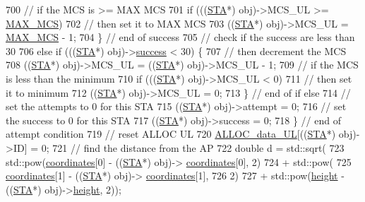 \begin{DoxyCode}
{{700                 \textcolor{comment}{// if the MCS is >= MAX MCS}
701                 \textcolor{keywordflow}{if} (((\hyperlink{classSTA}{STA}*) obj)->MCS\_UL >= \hyperlink{classAP_a1fe0d98f0db9557f18e560f8bc96c2fc}{MAX\_MCS})
702                     \textcolor{comment}{// then set it to MAX MCS}
703                     ((\hyperlink{classSTA}{STA}*) obj)->MCS\_UL = \hyperlink{classAP_a1fe0d98f0db9557f18e560f8bc96c2fc}{MAX\_MCS} - 1;
704             \} \textcolor{comment}{// end of success}
705               \textcolor{comment}{// check if the success are less than 30%
706             \textcolor{keywordflow}{else} \textcolor{keywordflow}{if} (((\hyperlink{classSTA}{STA}*) obj)->\hyperlink{classAP_aa9d8130f487d3ba13dc6b22fe5e3868d}{success} < 30) \{
707                 \textcolor{comment}{// then decrement the MCS}
708                 ((\hyperlink{classSTA}{STA}*) obj)->MCS\_UL = ((\hyperlink{classSTA}{STA}*) obj)->MCS\_UL - 1;
709                 \textcolor{comment}{// if the MCS is less than the minimum}
710                 \textcolor{keywordflow}{if} (((\hyperlink{classSTA}{STA}*) obj)->MCS\_UL < 0)
711                     \textcolor{comment}{// then set it to minimum}
712                     ((\hyperlink{classSTA}{STA}*) obj)->MCS\_UL = 0;
713             \} \textcolor{comment}{// end of if else}
714               \textcolor{comment}{// set the attempts to 0 for this STA}
715             ((\hyperlink{classSTA}{STA}*) obj)->attempt = 0;
716             \textcolor{comment}{// set the success to 0 for this STA}
717             ((\hyperlink{classSTA}{STA}*) obj)->success = 0;
718         \} \textcolor{comment}{// end of attempt condition}
719           \textcolor{comment}{// reset ALLOC UL}
720         \hyperlink{classAP_ae5567916229fb09fbb83af3cfad5d71d}{ALLOC\_data\_UL}[((\hyperlink{classSTA}{STA}*) obj)->ID] = 0;
721         \textcolor{comment}{// find the distance from the AP}
722         \textcolor{keywordtype}{double} d = std::sqrt(
723                 std::pow(\hyperlink{classAP_ac52816d18c4dc26158fa3bd2e63f3bcc}{coordinates}[0] - ((\hyperlink{classSTA}{STA}*) obj)->
      \hyperlink{classAP_ac52816d18c4dc26158fa3bd2e63f3bcc}{coordinates}[0], 2)
724                         + std::pow(
725                                 \hyperlink{classAP_ac52816d18c4dc26158fa3bd2e63f3bcc}{coordinates}[1] - ((\hyperlink{classSTA}{STA}*) obj)->
      \hyperlink{classAP_ac52816d18c4dc26158fa3bd2e63f3bcc}{coordinates}[1],
726                                 2)
727                         + std::pow(\hyperlink{classAP_a27fec97f7b61e45d1350555cf62535d4}{height} - ((\hyperlink{classSTA}{STA}*) obj)->\hyperlink{classAP_a27fec97f7b61e45d1350555cf62535d4}{height}, 2));
}}}
\end{DoxyCode}
